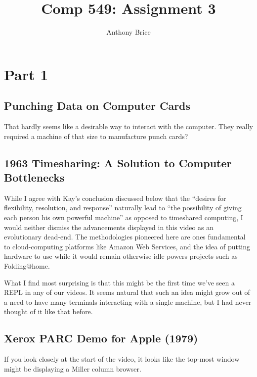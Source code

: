 \documentclass{abrice}
\title{Comp 549: Assignment 3}
\author{Anthony Brice}
\begin{document}
\maketitle

\section{Part 1}

\subsection{Punching Data on Computer Cards}

 That hardly seems like a desirable way to
interact with the computer. They really required a machine of that size to
manufacture punch cards?

\subsection{1963 Timesharing: A Solution to Computer Bottlenecks}

While I agree with Kay's conclusion discussed below that the ``desires for
flexibility, resolution, and response'' naturally lead to ``the possibility of
giving each person his own powerful machine'' as opposed to timeshared
computing, I would neither dismiss the advancements displayed in this video as
an evolutionary dead-end. The methodologies pioneered here are ones fundamental
to cloud-computing platforms like Amazon Web Services, and the idea of putting
hardware to use while it would remain otherwise idle powers projects such as
Folding@home.

What I find most surprising is that this might be the first time we've seen a
REPL in any of our videos. It seems natural that such an idea might grow out of
a need to have many terminals interacting with a single machine, but I had never
thought of it like that before.

\subsection{Xerox PARC Demo for Apple (1979)}

If you look closely at the start of the video, it looks like the top-most window
might be displaying a Miller column browser.
\end{document}
